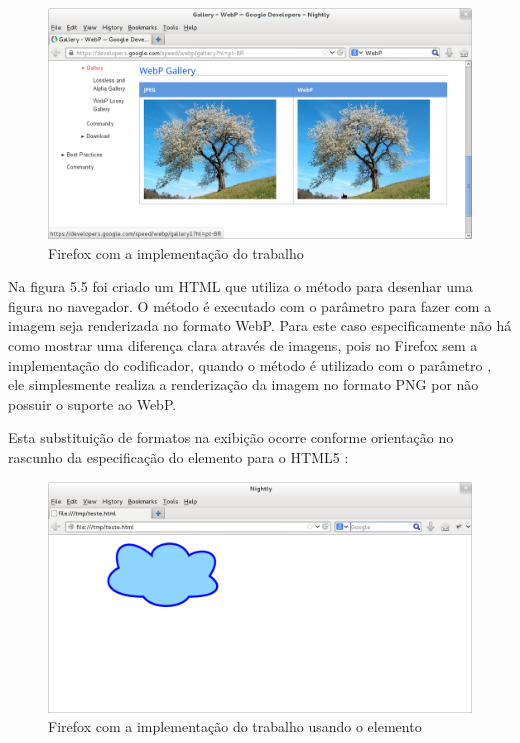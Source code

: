 \documentclass[espaco=simples,appendix=Name]{abnt}
\begin{document}
\begin{figure}[h]
  \centering
    \includegraphics[scale=0.3]{FirefoxComWebP.png}
  \caption{Firefox com a implementação do trabalho}
\end{figure}

Na figura 5.5 foi criado um HTML que utiliza o método  para desenhar uma figura no navegador. O método  é executado com o parâmetro  para fazer com a imagem seja renderizada no formato WebP. Para este caso especificamente não há como mostrar uma diferença clara através de imagens, pois no Firefox sem a implementação do codificador, quando o método  é utilizado com o parâmetro , ele simplesmente realiza a renderização da imagem no formato PNG por não possuir o suporte ao WebP. 

Esta substituição de formatos na exibição ocorre conforme orientação no rascunho da especificação do elemento  para o HTML5 \cite{CanvasElement}:
\begin{citacao}
\end{citacao}

\begin{figure}[h]
  \centering
    \includegraphics[scale=0.3]{HTML5CanvasFirefoxWebP.png}
  \caption{Firefox com a implementação do trabalho usando o elemento }
\end{figure}
\end{document}
